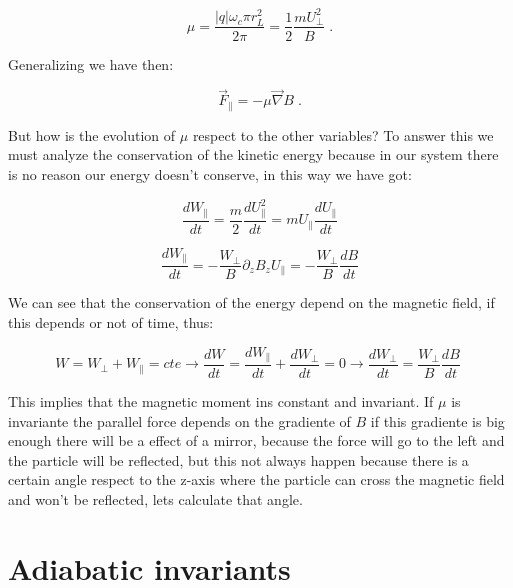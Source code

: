 \documentclass[spanish,notitlepage,letterpaper,11pt]{article} %
\numberwithin{equation}{subsection}
\begin{document}
        \begin{equation}
            \mu = \frac{|q|\omega_c\pi r_L^2}{2\pi} = \frac{1}{2}\frac{mU_{\perp}^2}{B}\;.
        \end{equation}

        Generalizing we have then: 

        \begin{equation}
            \Vec{F}_{\parallel} = -\mu \Vec{\nabla}B\;.
        \end{equation}

        But how is the evolution of $\mu$ respect to the other variables? To answer this we must analyze the conservation of the kinetic energy because in our system there is no reason our energy doesn't conserve, in this way we have got:

        \begin{equation*}
            \frac{dW_{\parallel}}{dt}=\frac{m}{2}\frac{dU_{\parallel}^2}{dt}=mU_{\parallel}\frac{dU_{\parallel}}{dt}
        \end{equation*}

        \begin{equation*}
            \frac{dW_{\parallel}}{dt} = -\frac{W_{\perp}}{B}\partial_zB_zU_{\parallel} = -\frac{W_{\perp}}{B}\frac{dB}{dt}
        \end{equation*}

        We can see that the conservation of the energy depend on the magnetic field, if this depends or not of time, thus:

        \begin{equation*}
            W = W_{\perp} + W_{\parallel} = cte \rightarrow \frac{dW}{dt} = \frac{dW_{\parallel}}{dt} + \frac{dW_{\perp}}{dt} = 0\rightarrow \frac{dW_{\perp}}{dt} = \frac{W_{\perp}}{B}\frac{dB}{dt}\;
        \end{equation*}

        This implies that the magnetic moment ins constant and invariant. If $\mu$ is invariante the parallel force depends on the gradiente of $B$ if this gradiente is big enough there will be a effect of a mirror, because the force will go to the left and the particle will be reflected, but this not always happen because there is a certain angle respect to the z-axis where the particle can cross the magnetic field and won't be reflected, lets calculate that angle.

    \section{Adiabatic invariants}
\end{document}
